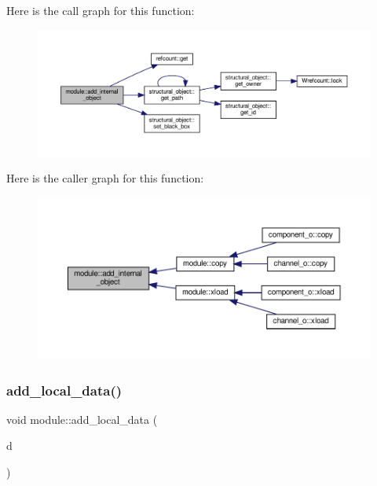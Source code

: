 Here is the call graph for this function\+:
\nopagebreak
\begin{figure}[H]
\begin{center}
\leavevmode
\includegraphics[width=350pt]{d0/dd3/classmodule_a7d1b70b4339dd86910a5d1cbb9ce314f_cgraph}
\end{center}
\end{figure}
Here is the caller graph for this function\+:
\nopagebreak
\begin{figure}[H]
\begin{center}
\leavevmode
\includegraphics[width=350pt]{d0/dd3/classmodule_a7d1b70b4339dd86910a5d1cbb9ce314f_icgraph}
\end{center}
\end{figure}
\mbox{\label{classmodule_a9571a7cbf910e5fe74273c0a4a2d10be}} 
\subsubsection{\texorpdfstring{add\+\_\+local\+\_\+data()}{add\_local\_data()}}
{\footnotesize\ttfamily void module\+::add\+\_\+local\+\_\+data (\begin{DoxyParamCaption}\item[{\hyperlink{structural__objects_8hpp_a8ea5f8cc50ab8f4c31e2751074ff60b2}{structural\+\_\+object\+Ref}}]{d }\end{DoxyParamCaption})}




